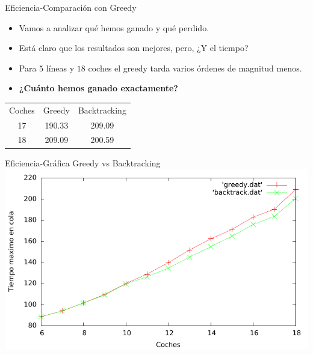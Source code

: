 \begin{frame}{Eficiencia-Comparación con Greedy}
	\begin{itemize}
		\item Vamos a analizar qué hemos ganado y qué perdido.
		\pause
		\item Está claro que los resultados son mejores, pero, ¿Y el tiempo?
		\pause
		\item Para $5$ líneas y $18$ coches el greedy tarda varios órdenes de magnitud menos.
		\item \textbf{¿Cuánto hemos ganado exactamente?}
		

	\end{itemize}
	\begin{center}
			\begin{tabular}{c|c|c}
				Coches	& Greedy  & Backtracking  \\ 
				17	& 190.33 &  209.09\\ 
				18	& 209.09 & 200.59
			\end{tabular}
			
	\end{center}

\end{frame}

\begin{frame}{Eficiencia-Gráfica Greedy vs Backtracking}
	\includegraphics[width = \linewidth]{./img/comp.pdf}
\end{frame}

